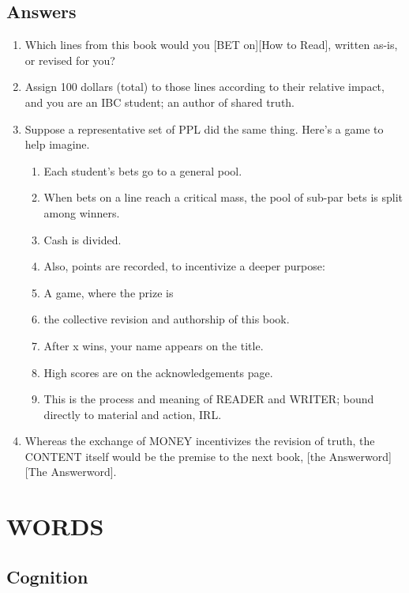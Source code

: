 \documentclass[
]{book}
\providecommand{\tightlist}{%
  \setlength{\itemsep}{0pt}\setlength{\parskip}{0pt}}
\begin{document}
\hypertarget{answers}{%
\section{Answers}\label{answers}}

\begin{enumerate}
\def\labelenumi{\arabic{enumi}.}
\setcounter{enumi}{86}
\item
  Which lines from this book would you {[}BET on{]}{[}How to Read{]}, written
  as-is, or revised for you?
\item
  Assign 100 dollars (total) to those lines according to their
  relative impact, and you are an IBC student; an author of shared
  truth.
\item
  Suppose a representative set of PPL did the same thing. Here's a
  game to help imagine.

  \begin{enumerate}
  \def\labelenumii{\arabic{enumii}.}
  \tightlist
  \item
    Each student's bets go to a general pool.
  \item
    When bets on a line reach a critical mass, the pool of sub-par
    bets is split among winners.
  \item
    Cash is divided.
  \item
    Also, points are recorded, to incentivize a deeper purpose:
  \item
    A game, where the prize is
  \item
    the collective revision and authorship of this book.
  \item
    After x wins, your name appears on the title.
  \item
    High scores are on the acknowledgements page.
  \item
    This is the process and meaning of READER and WRITER; bound
    directly to material and action, IRL.
  \end{enumerate}
\item
  Whereas the exchange of MONEY incentivizes the revision of truth,
  the CONTENT itself would be the premise to the next book, {[}the
  Answerword{]}{[}The Answerword{]}.
\end{enumerate}

\hypertarget{words}{%
\chapter{WORDS}\label{words}}

\hypertarget{cognition}{%
\section{Cognition}\label{cognition}}
\end{document}

